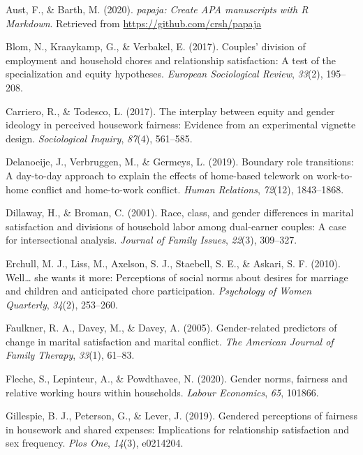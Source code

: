 \documentclass[
  english,
  man]{apa6}
\newlength{\cslhangindent}
\newenvironment{cslreferences}%
  {\setlength{\parindent}{0pt}%
  \everypar{\setlength{\hangindent}{\cslhangindent}}\ignorespaces}%
  {\par}
\begin{document}
\hypertarget{refs}{}
\begin{cslreferences}
\leavevmode\hypertarget{ref-R-papaja}{}%
Aust, F., \& Barth, M. (2020). \emph{papaja: Create APA manuscripts with R Markdown}. Retrieved from \url{https://github.com/crsh/papaja}

\leavevmode\hypertarget{ref-blom2017couples}{}%
Blom, N., Kraaykamp, G., \& Verbakel, E. (2017). Couples' division of employment and household chores and relationship satisfaction: A test of the specialization and equity hypotheses. \emph{European Sociological Review}, \emph{33}(2), 195--208.

\leavevmode\hypertarget{ref-carriero2017interplay}{}%
Carriero, R., \& Todesco, L. (2017). The interplay between equity and gender ideology in perceived housework fairness: Evidence from an experimental vignette design. \emph{Sociological Inquiry}, \emph{87}(4), 561--585.

\leavevmode\hypertarget{ref-delanoeije2019boundary}{}%
Delanoeije, J., Verbruggen, M., \& Germeys, L. (2019). Boundary role transitions: A day-to-day approach to explain the effects of home-based telework on work-to-home conflict and home-to-work conflict. \emph{Human Relations}, \emph{72}(12), 1843--1868.

\leavevmode\hypertarget{ref-dillaway2001race}{}%
Dillaway, H., \& Broman, C. (2001). Race, class, and gender differences in marital satisfaction and divisions of household labor among dual-earner couples: A case for intersectional analysis. \emph{Journal of Family Issues}, \emph{22}(3), 309--327.

\leavevmode\hypertarget{ref-erchull2010well}{}%
Erchull, M. J., Liss, M., Axelson, S. J., Staebell, S. E., \& Askari, S. F. (2010). Well\ldots{} she wants it more: Perceptions of social norms about desires for marriage and children and anticipated chore participation. \emph{Psychology of Women Quarterly}, \emph{34}(2), 253--260.

\leavevmode\hypertarget{ref-faulkner2005gender}{}%
Faulkner, R. A., Davey, M., \& Davey, A. (2005). Gender-related predictors of change in marital satisfaction and marital conflict. \emph{The American Journal of Family Therapy}, \emph{33}(1), 61--83.

\leavevmode\hypertarget{ref-fleche2020gender}{}%
Fleche, S., Lepinteur, A., \& Powdthavee, N. (2020). Gender norms, fairness and relative working hours within households. \emph{Labour Economics}, \emph{65}, 101866.

\leavevmode\hypertarget{ref-gillespie2019gendered}{}%
Gillespie, B. J., Peterson, G., \& Lever, J. (2019). Gendered perceptions of fairness in housework and shared expenses: Implications for relationship satisfaction and sex frequency. \emph{Plos One}, \emph{14}(3), e0214204.


\end{cslreferences}
\end{document}
